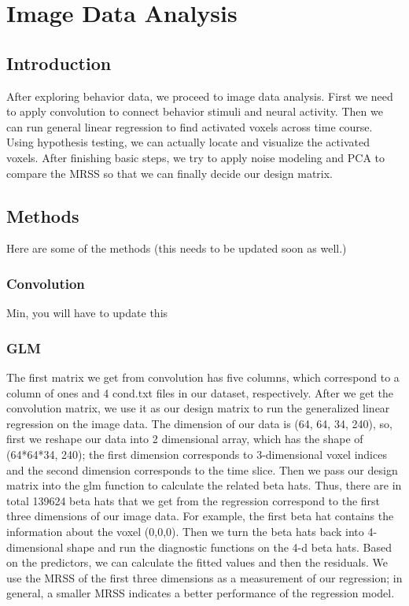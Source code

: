 \section{Image Data Analysis}
\subsection{Introduction}
\noindent
After exploring behavior data, we proceed to image data analysis.  First we need to apply convolution to connect behavior stimuli and neural activity. Then we can run general linear regression to find activated voxels across time course. Using hypothesis testing, we can actually locate and visualize the activated voxels. After finishing basic steps, we try to apply noise modeling and PCA to compare the MRSS so that we can finally decide our design matrix.

\subsection{Methods}
Here are some of the methods (this needs to be updated soon as well.)

\subsubsection {Convolution}
Min, you will have to update this

\subsubsection {GLM}
The first matrix we get from convolution has five columns, which correspond to a column of ones and 4 cond.txt files in our dataset, respectively. After we get the convolution matrix, we use it as our design matrix to run the generalized linear regression on the image data. The dimension of our data is (64, 64, 34, 240), so, first we reshape our data into 2 dimensional array, which has the shape of (64*64*34, 240); the first dimension corresponds to 3-dimensional voxel indices and the second dimension corresponds to the time slice. Then we pass our design matrix into the glm function to calculate the related beta hats. Thus, there are in total 139624 beta hats that we get from the regression correspond to the first three dimensions of our image data. For example, the first beta hat contains the information about the voxel (0,0,0). Then we turn the beta hats back into 4-dimensional shape and run the diagnostic functions on the 4-d beta hats. Based on the predictors, we can calculate the fitted values and then the residuals. We use the MRSS of the first three dimensions as a measurement of our regression; in general, a smaller MRSS indicates a better performance of the regression model. 

